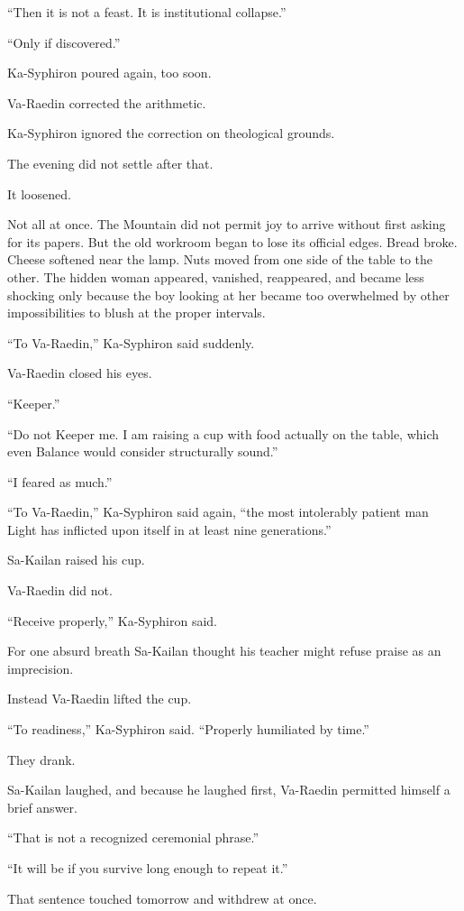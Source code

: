 “Then it is not a feast. It is institutional collapse.”\par
“Only if discovered.”\par
Ka-Syphiron poured again, too soon.\par
Va-Raedin corrected the arithmetic.\par
Ka-Syphiron ignored the correction on theological grounds.\par
The evening did not settle after that.\par
It loosened.\par
Not all at once. The Mountain did not permit joy to arrive without first asking for its papers. But the old workroom began to lose its official edges. Bread broke. Cheese softened near the lamp. Nuts moved from one side of the table to the other. The hidden woman appeared, vanished, reappeared, and became less shocking only because the boy looking at her became too overwhelmed by other impossibilities to blush at the proper intervals.\par
“To Va-Raedin,” Ka-Syphiron said suddenly.\par
Va-Raedin closed his eyes.\par
“Keeper.”\par
“Do not Keeper me. I am raising a cup with food actually on the table, which even Balance would consider structurally sound.”\par
“I feared as much.”\par
“To Va-Raedin,” Ka-Syphiron said again, “the most intolerably patient man Light has inflicted upon itself in at least nine generations.”\par
Sa-Kailan raised his cup.\par
Va-Raedin did not.\par
“Receive properly,” Ka-Syphiron said.\par
For one absurd breath Sa-Kailan thought his teacher might refuse praise as an imprecision.\par
Instead Va-Raedin lifted the cup.\par
“To readiness,” Ka-Syphiron said. “Properly humiliated by time.”\par
They drank.\par
Sa-Kailan laughed, and because he laughed first, Va-Raedin permitted himself a brief answer.\par
“That is not a recognized ceremonial phrase.”\par
“It will be if you survive long enough to repeat it.”\par
That sentence touched tomorrow and withdrew at once.\par
